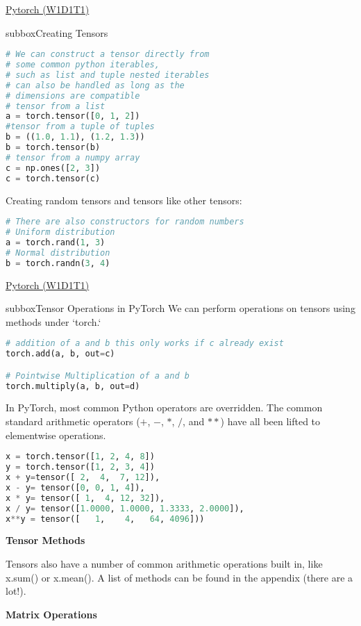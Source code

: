 \begin{multicols}{3}
\begin{textbox}{\href{https://deeplearning.neuromatch.io/tutorials/W1D1_BasicsAndPytorch/student/W1D1_Tutorial1.html}{Pytorch (W1D1T1) }}
\begin{subbox}{subbox}{Creating Tensors}
\begin{lstlisting}[language=Python]
# We can construct a tensor directly from 
# some common python iterables,
# such as list and tuple nested iterables 
# can also be handled as long as the
# dimensions are compatible
# tensor from a list
a = torch.tensor([0, 1, 2])
#tensor from a tuple of tuples
b = ((1.0, 1.1), (1.2, 1.3))
b = torch.tensor(b)
# tensor from a numpy array
c = np.ones([2, 3])
c = torch.tensor(c)
\end{lstlisting}
Creating random tensors and tensors like other tensors:
\begin{lstlisting}[language=Python]
# There are also constructors for random numbers
# Uniform distribution
a = torch.rand(1, 3)
# Normal distribution
b = torch.randn(3, 4)
\end{lstlisting}
\end{subbox}
\end{textbox}
\begin{textbox}{\href{https://deeplearning.neuromatch.io/tutorials/W1D1_BasicsAndPytorch/student/W1D1_Tutorial1.html}{Pytorch (W1D1T1) }}
\begin{subbox}{subbox}{Tensor Operations in PyTorch}
\scriptsize
We can perform operations on tensors using methods under `torch.`

\begin{lstlisting}[language=Python]
# addition of a and b this only works if c already exist
torch.add(a, b, out=c)

# Pointwise Multiplication of a and b
torch.multiply(a, b, out=d)

\end{lstlisting}
In PyTorch, most common Python operators are overridden.
The common standard arithmetic operators ($+$, $-$, $*$, $/$, and $**$) have all been lifted to elementwise operations.
\begin{lstlisting}[language=Python]
x = torch.tensor([1, 2, 4, 8])
y = torch.tensor([1, 2, 3, 4])
x + y=tensor([ 2,  4,  7, 12]),
x - y= tensor([0, 0, 1, 4]),
x * y= tensor([ 1,  4, 12, 32]),
x / y= tensor([1.0000, 1.0000, 1.3333, 2.0000]),
x**y = tensor([   1,    4,   64, 4096]))
\end{lstlisting}
\textbf{Tensor Methods}

Tensors also have a number of common arithmetic operations built in, like x.sum() or x.mean(). A list of methods can be found  in the appendix (there are a lot!).

\textbf{Matrix Operations}


\end{subbox}
\end{textbox}
\end{multicols}
